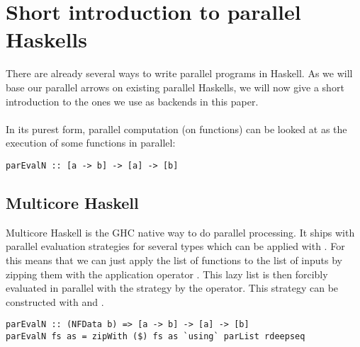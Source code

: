 \section{Short introduction to parallel Haskells}
There are already several ways to write parallel programs in Haskell. As we will base our parallel arrows on existing parallel Haskells, we will now give a short introduction to the ones we use as backends in this paper.
\\\\
In its purest form, parallel computation (on functions) can be looked at as the execution of some functions  in parallel:
\begin{lstlisting}[frame=htrbl]
parEvalN :: [a -> b] -> [a] -> [b]
\end{lstlisting}

\subsection{Multicore Haskell}
Multicore Haskell \cite{multicore_hackage} is the GHC native way to do parallel processing. It ships with parallel evaluation strategies for several types which can be applied with . For  this means that we can just apply the list of functions \code{[a -> b]} to the list of inputs \code{[a]} by zipping them with the application operator \code{\$}. This lazy list \code{[b]} is then forcibly evaluated in parallel with the strategy  by the  operator. This strategy can be constructed with  and .
\begin{lstlisting}[frame=htrbl]
parEvalN :: (NFData b) => [a -> b] -> [a] -> [b]
parEvalN fs as = zipWith ($) fs as `using` parList rdeepseq
\end{lstlisting}

